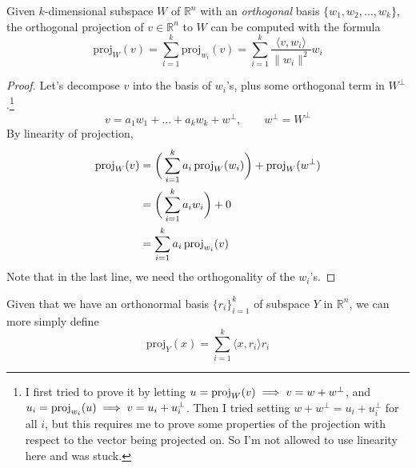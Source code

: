 	\begin{theorem}
	  \label{thm:orthogonal-projection-formula-in-rn}
		Given $k$-dimensional subspace $W$ of $\mathbb{R}^n$ with an \textit{orthogonal} basis $\{w_1, w_2, \ldots, w_k\}$, the orthogonal projection of $v \in \mathbb{R}^n$ to $W$ can be computed with the formula 
    \begin{equation}
			\text{proj}_W (v) = \sum_{i=1}^k \text{proj}_{w_i} (v) = \sum_{i=1}^k \frac{\langle v, w_i \rangle}{\|w_i\|^2} w_i 
    \end{equation}
  \end{theorem}
	\begin{proof}
		Let's decompose $v$ into the basis of $w_i$'s, plus some orthogonal term in $W^\perp$.\footnote{I first tried to prove it by letting $u = \operatorname{proj}_W (v) \implies v = w + w^\perp$, and $u_i = \operatorname{proj}_{w_i} (u) \implies v = u_i + u_i^\perp$. Then I tried setting $w + w^\perp = u_i + u_i^\perp$ for all $i$, but this requires me to prove some properties of the projection with respect to the vector being projected on. So I'm not allowed to use linearity here and was stuck. }
		\begin{equation}
		  v = a_1 w_1 + \ldots + a_k w_k + w^\perp, \qquad w^\perp = W^\perp
		\end{equation} 
		By linearity of projection, 
		\begin{align}
			\operatorname{proj}_W (v) & = \bigg( \sum_{i=1}^k a_i \operatorname{proj}_W (w_i) \bigg) + \operatorname{proj}_W (w^\perp) \\ 
									& = \bigg( \sum_{i=1}^k a_i w_i \bigg) + 0 \\ 
									& = \sum_{i=1}^k a_i \operatorname{proj}_{w_i} (v)
		\end{align}
		Note that in the last line, we need the orthogonality of the $w_i$'s. 
	\end{proof}

  Given that we have an orthonormal basis $\{r_i\}_{i=1}^k$ of subspace $Y$ in $\mathbb{R}^n$, we can more simply define 
  \begin{equation}
    \text{proj}_Y (x) = \sum_{i=1}^k \langle x, r_i \rangle r_i
  \end{equation}

